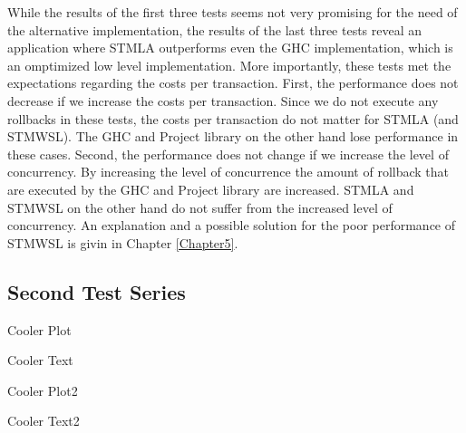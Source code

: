 While the results of the first three tests seems not very promising for the need of the alternative implementation, the results
of the last three tests reveal an application where STMLA outperforms even the GHC implementation, which is an omptimized low 
level  implementation. More importantly, these tests met the expectations regarding the costs per transaction. First,
the performance does not decrease if we increase the costs per transaction. Since we do not execute any rollbacks in these 
tests, the costs per transaction do not matter for STMLA (and STMWSL). The GHC and Project library on the other hand 
lose performance in these cases. Second, the performance does not change if we increase the level of concurrency. By increasing
the level of concurrence the amount of rollback that are executed by the GHC and Project library are increased. STMLA and STMWSL
on the other hand do not suffer from the increased level of concurrency. 
An explanation and a possible solution for the poor performance of STMWSL is givin in Chapter \ref{Chapter5}.


\subsection{Second Test Series}
Cooler Plot 

Cooler Text 

Cooler Plot2

Cooler Text2



